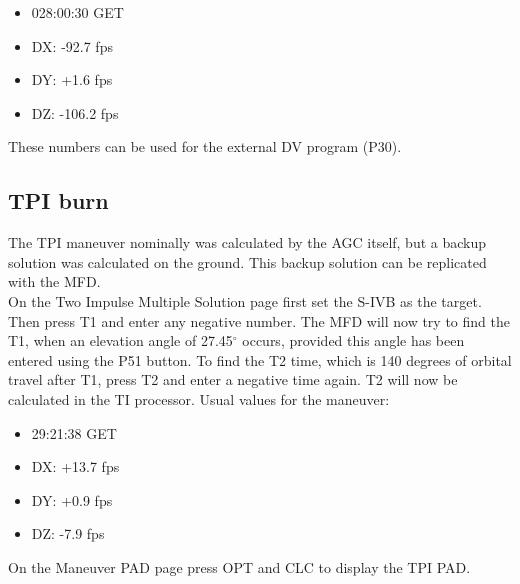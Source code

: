 \documentclass[11pt]{article} %
\begin{document}
\begin{itemize}
	\item{028:00:30 GET}
	\item{DX: -92.7 fps}
	\item{DY: +1.6 fps}
	\item{DZ: -106.2 fps}
\end{itemize}

These numbers can be used for the external DV program (P30).

\subsection{TPI burn}

The TPI maneuver nominally was calculated by the AGC itself, but a backup solution was calculated on the ground. This backup solution can be replicated with the MFD.\\
On the Two Impulse Multiple Solution page first set the S-IVB as the target. Then press T1 and enter any negative number. The MFD will now try to find the T1, when an elevation angle of 27.45$^{\circ}$ occurs, provided this angle has been entered using the P51 button. To find the T2 time, which is 140 degrees of orbital travel after T1, press T2 and enter a negative time again. T2 will now be calculated in the TI processor. Usual values for the maneuver:

\begin{itemize}
	\item{29:21:38 GET}
	\item{DX: +13.7 fps}
	\item{DY: +0.9 fps}
	\item{DZ: -7.9 fps}
\end{itemize}
	
On the Maneuver PAD page press OPT and CLC to display the TPI PAD.\\



\end{document}
